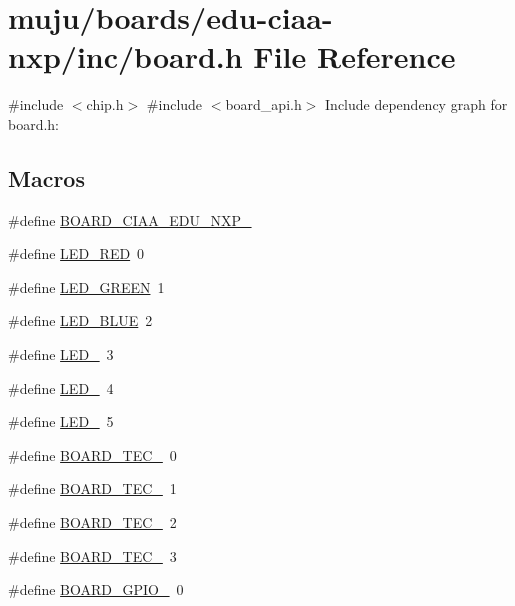 \hypertarget{edu-ciaa-nxp_2inc_2board_8h}{}\section{muju/boards/edu-\/ciaa-\/nxp/inc/board.h File Reference}
\label{edu-ciaa-nxp_2inc_2board_8h}
{\ttfamily \#include $<$chip.\+h$>$}\newline
{\ttfamily \#include $<$board\+\_\+api.\+h$>$}\newline
Include dependency graph for board.\+h\+:
\subsection*{Macros}
\begin{DoxyCompactItemize}
\item 
\#define \hyperlink{group__hal_ga6f515d6e3593a320103673302982cde0}{B\+O\+A\+R\+D\+\_\+\+C\+I\+A\+A\+\_\+\+E\+D\+U\+\_\+\+N\+X\+P\+\_}
\item 
\#define \hyperlink{group__hal_ga31e20330f8ce94e0dd10b005a15c5898}{L\+E\+D\+\_\+\+R\+ED}~0
\item 
\#define \hyperlink{group__hal_gaca338dbd19d7940923334629f6e5f3b7}{L\+E\+D\+\_\+\+G\+R\+E\+EN}~1
\item 
\#define \hyperlink{group__hal_gae2e40566d27689f8581d7b0f12271d45}{L\+E\+D\+\_\+\+B\+L\+UE}~2
\item 
\#define \hyperlink{group__hal_gaaf81f5fa7d1e779f83e9bf4ce631a7b6}{L\+E\+D\+\_}~3
\item 
\#define \hyperlink{group__hal_gae60a8c1e03b38463f77d556a4a0a8a3b}{L\+E\+D\+\_}~4
\item 
\#define \hyperlink{group__hal_ga07b3fb51ae7c3cc824dd714b46c1b2b6}{L\+E\+D\+\_}~5
\item 
\#define \hyperlink{group__hal_ga92373c8e6c1167c7124e0a314a4250a8}{B\+O\+A\+R\+D\+\_\+\+T\+E\+C\+\_}~0
\item 
\#define \hyperlink{group__hal_gabf1d0431d3373cbd629fb3d0b9db3859}{B\+O\+A\+R\+D\+\_\+\+T\+E\+C\+\_}~1
\item 
\#define \hyperlink{group__hal_ga63f25b055bc23d46b810b2d4d9b0a0a7}{B\+O\+A\+R\+D\+\_\+\+T\+E\+C\+\_}~2
\item 
\#define \hyperlink{group__hal_ga675dc8974b57a5a12d2b1d3df029468f}{B\+O\+A\+R\+D\+\_\+\+T\+E\+C\+\_}~3
\item 
\#define \hyperlink{group__hal_gaf94367bd0fac186967e17f1c374ab6d9}{B\+O\+A\+R\+D\+\_\+\+G\+P\+I\+O\+\_}~0

\end{DoxyCompactItemize}
